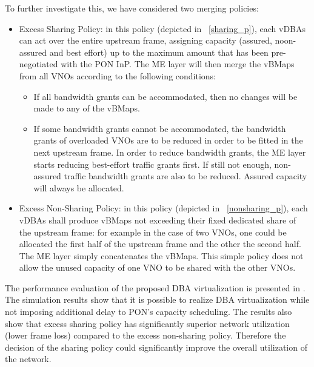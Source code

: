 To further investigate this, we have considered two merging policies:
\begin{itemize}
    \item Excess Sharing Policy: in this policy (depicted in \figureautorefname~\ref{sharing_p}), each \acp{vDBA} can act over the entire upstream frame, assigning capacity (assured, noon-assured and best effort) up to the maximum amount that has been pre-negotiated with the \ac{PON} \ac{InP}. The \ac{ME} layer will then merge the \acp{vBMap} from all \acp{VNO} according to the following conditions:
        \begin{itemize}
            \item If all bandwidth grants can be accommodated, then no changes will be made to any of the \acp{vBMap}.
            
            \item If some bandwidth grants cannot be accommodated, the bandwidth grants of overloaded \acp{VNO} are to be reduced in order to be fitted in the next upstream frame. In order to reduce bandwidth grants, the \ac{ME} layer starts reducing best-effort traffic grants first. If still not enough, non-assured traffic bandwidth grants are also to be reduced. Assured capacity will always be allocated.
        \end{itemize}

    \item Excess Non-Sharing Policy: in this policy (depicted in \figureautorefname~\ref{nonsharing_p}), each \acp{vDBA} shall produce \acp{vBMap} not exceeding their fixed dedicated share of the upstream frame: for example in the case of two \acp{VNO}, one could be allocated the first half of the upstream frame and the other the second half. The \ac{ME} layer simply concatenates the \acp{vBMap}. This simple policy does not allow the unused capacity of one \ac{VNO} to be shared with the other \acp{VNO}.
\end{itemize}

The performance evaluation of the proposed \ac{DBA} virtualization is presented in \cite{Elrasad:17}. The simulation results show that it is possible to realize \ac{DBA} virtualization while not imposing additional delay to \ac{PON}'s capacity scheduling. The results also show that excess sharing policy has significantly superior network utilization (lower frame loss) compared to the excess non-sharing policy. Therefore the decision of the sharing policy could significantly improve the overall utilization of the network.

